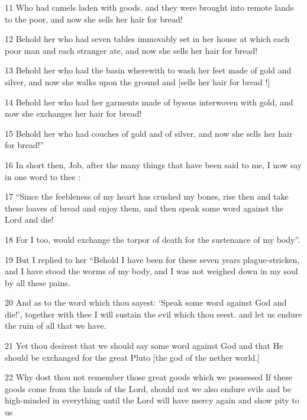 \par 11 Who had camels laden with goods. and they were brought into remote lands to the poor, and now she sells her hair for bread!

\par 12 Behold her who had seven tables immovably set in her house at which each poor man and each stranger ate, and now she sells her hair for bread!

\par 13 Behold her who had the basin wherewith to wash her feet made of gold and silver, and now she walks upon the ground and [sells her hair for bread !]

\par 14 Behold her who had her garments made of byssus interwoven with gold, and now she exchanges her hair for bread!

\par 15 Behold her who had couches of gold and of silver, and now she sells her hair for bread!”

\par 16 In short then, Job, after the many things that have been said to me, I now say in one word to thee :

\par 17 “Since the feebleness of my heart has crushed my bones, rise then and take these loaves of bread and enjoy them, and then speak some word against the Lord and die!

\par 18 For I too, would exchange the torpor of death for the sustenance of my body”. 

\par 19 But I replied to her “Behold I have been for these seven years plague-stricken, and I have stood the worms of my body, and I was not weighed down in my soul by all these pains.

\par 20 And as to the word which thou sayest: ‘Speak some word against God and die!’, together with thee I will sustain the evil which thou seest. and let us endure the ruin of all that we have.

\par 21 Yet thou desirest that we should say some word against God and that He should be exchanged for the great Pluto [the god of the nether world.]

\par 22 Why dost thou not remember those great goods which we possessed If these goods come from the lands of the Lord, should not we also endure evils and be high-minded in everything until the Lord will have mercy again and show pity to us

